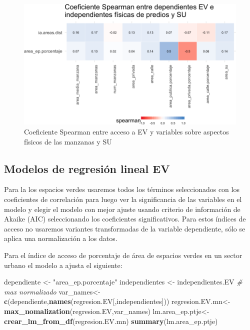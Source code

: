 \documentclass[12pt,]{book}
\newenvironment{Shaded}{\begin{snugshade}}{\end{snugshade}}
\newcommand{\KeywordTok}[1]{\textcolor[rgb]{0.13,0.29,0.53}{\textbf{#1}}}
\newcommand{\StringTok}[1]{\textcolor[rgb]{0.31,0.60,0.02}{#1}}
\newcommand{\CommentTok}[1]{\textcolor[rgb]{0.56,0.35,0.01}{\textit{#1}}}
\newcommand{\NormalTok}[1]{#1}
\begin{document}
\begin{figure}
\includegraphics[width=1\linewidth]{tesis-unigis_files/figure-latex/tile-ev-fisica-spearman-1} \caption{Coeficiente Spearman entre acceso a EV y variables sobre aspectos físicos de las manzanas y SU}\label{fig:tile-ev-fisica-spearman}
\end{figure}

\subsection{Modelos de regresión lineal
EV}\label{modelos-de-regresion-lineal-ev}

Para la los espacios verdes usaremos todos los términos seleccionados
con los coeficientes de correlación para luego ver la significancia de
las variables en el modelo y elegir el modelo con mejor ajuste usando
criterio de información de Akaike (AIC) seleccionando los coeficientes
significativos. Para estos índices de acceso no usaremos variantes
transformadas de la variable dependiente, sólo se aplica una
normalización a los datos.

Para el índice de acceso de porcentaje de área de espacios verdes en un
sector urbano el modelo a ajusta el siguiente:

\begin{Shaded}
\begin{Highlighting}[]
\NormalTok{dependiente <-}\StringTok{ "area_ep.porcentaje"}
\NormalTok{independientes  <-}\StringTok{ }\NormalTok{independientes.EV}
\CommentTok{# max normalizado }
\NormalTok{var_names<-}\KeywordTok{c}\NormalTok{(dependiente,}\KeywordTok{names}\NormalTok{(regresion.EV[,independientes]))}
\NormalTok{regresion.EV.mn<-}\KeywordTok{max_nomalization}\NormalTok{(regresion.EV,var_names)}
\NormalTok{lm.area_ep.ptje<-}\KeywordTok{crear_lm_from_df}\NormalTok{(regresion.EV.mn)}
\KeywordTok{summary}\NormalTok{(lm.area_ep.ptje)}
\end{Highlighting}
\end{Shaded}
\end{document}
